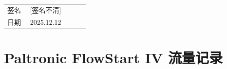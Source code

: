 \documentclass[UTF8,10pt,a4paper,fontset=fandol]{ctexart}
\newcommand{\fieldvalue}[1]{#1}
\newcommand{\handwritten}[1]{#1}
\begin{document}
\begin{tabular}{@{}p{0.25\linewidth}p{0.65\linewidth}@{}}
签名 &
\fieldvalue{\handwritten{[签名不清]}}
\\
日期 &
\fieldvalue{\handwritten{2025.12.12}}
\end{tabular}


\newpage

\section*{Paltronic FlowStart IV 流量记录}
\end{document}

